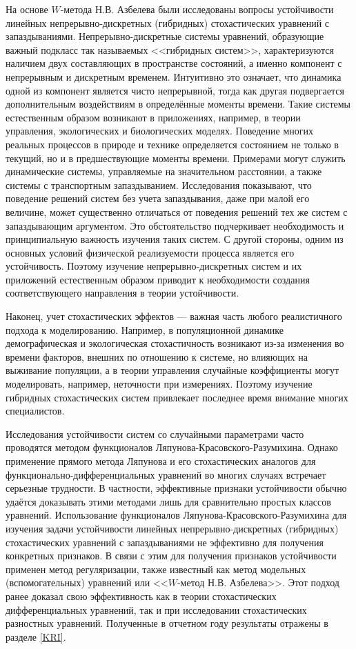На основе $W$-метода Н.В. Азбелева были исследованы вопросы устойчивости линейных непрерывно-дискретных (гибридных)
стохастических уравнений с запаздываниями. Непрерывно-дискретные системы уравнений, образующие важный подкласс так называемых <<гибридных систем>>, характеризуются наличием двух составляющих в пространстве состояний, а именно компонент с непрерывным и дискретным временем. Интуитивно это означает, что динамика одной из компонент является чисто непрерывной, тогда как другая подвергается дополнительным воздействиям в определённые моменты времени. Такие системы естественным образом возникают в приложениях, например, в теории управления, экологических и биологических моделях. Поведение многих реальных процессов в природе и технике определяется состоянием не только в текущий, но и в предшествующие моменты времени. Примерами могут служить динамические системы, управляемые
на значительном расстоянии, а также системы с транспортным запаздыванием. Исследования показывают, что поведение решений систем
без учета запаздывания, даже при малой его величине, может существенно отличаться от поведения решений тех же систем с
запаздывающим аргументом. Это обстоятельство подчеркивает необходимость и принципиальную важность изучения таких систем. С
другой стороны, одним из основных условий физической реализуемости процесса является его устойчивость. Поэтому изучение непрерывно-дискретных
систем и их приложений естественным образом приводит к необходимости создания соответствующего направления в теории устойчивости.

Наконец, учет стохастических эффектов --- важная часть любого реалистичного подхода к моделированию. Например, в популяционной
динамике демографическая и экологическая стохастичность возникают из-за изменения во времени факторов, внешних по отношению к системе,
но влияющих на выживание популяции, а в теории управления случайные коэффициенты могут моделировать, например, неточности при
измерениях. Поэтому изучение гибридных стохастических систем привлекает последнее время внимание многих специалистов.

Исследования устойчивости систем со случайными параметрами часто проводятся методом функционалов Ляпунова-Красовского-Разумихина.
Однако применение прямого метода Ляпунова и его стохастических аналогов для функционально-дифференциальных уравнений во
многих случаях встречает серьезные трудности. В частности, эффективные признаки устойчивости обычно удаётся доказывать этими
методами лишь для сравнительно простых классов уравнений.
Использование функционалов Ляпунова-Красовского-Разумихина для изучения задачи устойчивости линейных непрерывно-дискретных (гибридных)
стохастических уравнений с запаздываниями не эффективно для получения конкретных признаков. В связи с этим для получения признаков устойчивости применен метод регуляризации, также известный как метод модельных (вспомогательных) уравнений или <<$W$-метод Н.В. Азбелева>>. Этот подход ранее доказал
свою эффективность как в теории стохастических дифференциальных уравнений, так и при исследовании стохастических разностных
уравнений. Полученные в отчетном году результаты отражены в разделе \ref{KRI}.

